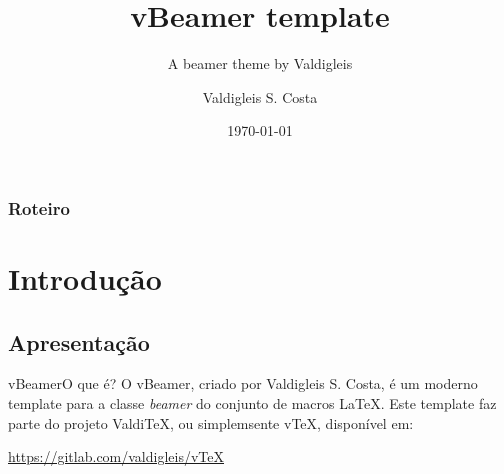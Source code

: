 \documentclass[9pt]{beamer}
\title{vBeamer template}
\subtitle{A beamer theme by Valdigleis}
\author{Valdigleis S. Costa}
\institute{UNIVASF, Salgueiro-PE}
\date{\today}
\begin{document}
  \titlepage

  \begin{frame}
    \frametitle{Roteiro}
    \tableofcontents
  \end{frame}

  \section{Introdução}

  \subsection{Apresentação}

  \begin{frame}{vBeamer}{O que é?}
    O vBeamer, criado por Valdigleis S. Costa, é um moderno template para a classe {\it beamer} do conjunto de macros {\LaTeX}. Este template faz parte do projeto {Valdi\TeX}, ou simplemsente {v\TeX}, disponível em:
    \begin{center}
      \url{https://gitlab.com/valdigleis/vTeX}
    \end{center}
  \end{frame}
\end{document}
